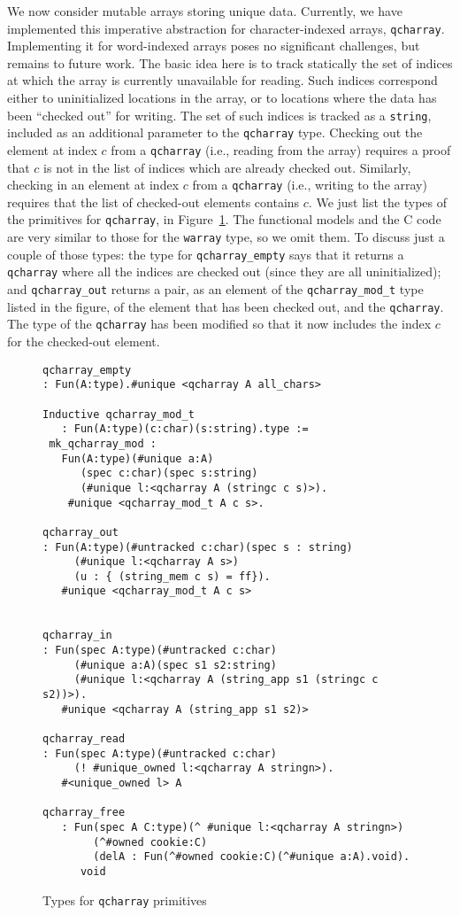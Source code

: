 \documentclass[9pt,natbib]{sigplanconf}
\begin{document}
We now consider mutable arrays storing unique data.  Currently, we
have implemented this imperative abstraction for character-indexed
arrays, \texttt{qcharray}.  Implementing it for word-indexed arrays
poses no significant challenges, but remains to future work.  The
basic idea here is to track statically the set of indices at which the
array is currently unavailable for reading.  Such indices correspond
either to uninitialized locations in the array, or to locations where
the data has been ``checked out'' for writing.  The set of such
indices is tracked as a \texttt{string}, included as an additional
parameter to the \texttt{qcharray} type. Checking out the element at
index $c$ from a \texttt{qcharray} (i.e., reading from the array)
requires a proof that $c$ is not in the list of indices which are
already checked out.  Similarly, checking in an element at index $c$
from a \texttt{qcharray} (i.e., writing to the array) requires that
the list of checked-out elements contains $c$.  We just list the types
of the primitives for \texttt{qcharray}, in Figure~\ref{fig:qcharray}.
The functional models and the C code are very similar to those for the
\texttt{warray} type, so we omit them.  To discuss just a couple of
those types: the type for \texttt{qcharray\_empty} says that it
returns a \texttt{qcharray} where all the indices are checked out
(since they are all uninitialized); and \texttt{qcharray\_out} returns
a pair, as an element of the \texttt{qcharray\_mod\_t} type listed in
the figure, of the element that has been checked out, and the
\texttt{qcharray}.  The type of the \texttt{qcharray} has been
modified so that it now includes the index $c$ for the checked-out
element.

\begin{figure}
\small
\begin{verbatim}
qcharray_empty 
: Fun(A:type).#unique <qcharray A all_chars>

Inductive qcharray_mod_t
   : Fun(A:type)(c:char)(s:string).type :=
 mk_qcharray_mod : 
   Fun(A:type)(#unique a:A)
      (spec c:char)(spec s:string)
      (#unique l:<qcharray A (stringc c s)>).
    #unique <qcharray_mod_t A c s>.

qcharray_out 
: Fun(A:type)(#untracked c:char)(spec s : string)
     (#unique l:<qcharray A s>)
     (u : { (string_mem c s) = ff}).
   #unique <qcharray_mod_t A c s>


qcharray_in
: Fun(spec A:type)(#untracked c:char)
     (#unique a:A)(spec s1 s2:string)
     (#unique l:<qcharray A (string_app s1 (stringc c s2))>). 
   #unique <qcharray A (string_app s1 s2)>

qcharray_read
: Fun(spec A:type)(#untracked c:char)
     (! #unique_owned l:<qcharray A stringn>). 
   #<unique_owned l> A 

qcharray_free
   : Fun(spec A C:type)(^ #unique l:<qcharray A stringn>)
        (^#owned cookie:C)
        (delA : Fun(^#owned cookie:C)(^#unique a:A).void).
      void 
\end{verbatim}
\label{fig:qcharray}
\caption{Types for \texttt{qcharray} primitives}
\end{figure}
\end{document}
